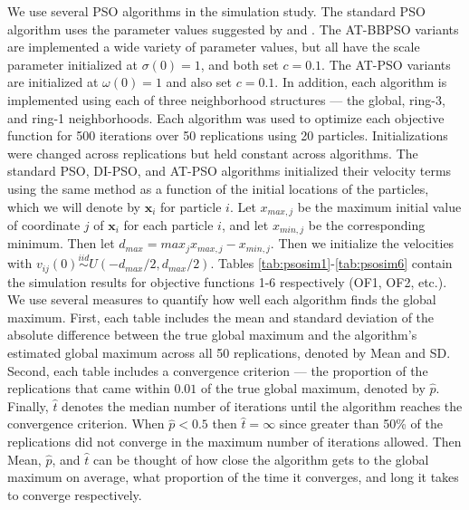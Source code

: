 \documentclass[12pt]{article}
\begin{document}
We use several PSO algorithms in the simulation study. The standard PSO algorithm uses the parameter values suggested by \cite{blum2008swarm} and \cite{clerc2002particle}. The AT-BBPSO variants are implemented a wide variety of parameter values, but all have the scale parameter initialized at $\sigma(0)=1$, and both set $c=0.1$. The AT-PSO variants are initialized at $\omega(0)=1$ and also set $c=0.1$. In addition, each algorithm is implemented using each of three neighborhood structures --- the global, ring-3, and ring-1 neighborhoods. Each algorithm was used to optimize each objective function for 500 iterations over 50 replications using 20 particles. Initializations were changed across replications but held constant across algorithms. The standard PSO, DI-PSO, and AT-PSO algorithms initialized their velocity terms using the same method as a function of the initial locations of the particles, which we will denote by $\bm{x}_i$ for particle $i$. Let $x_{max,j}$ be the maximum initial value of coordinate $j$ of $\bm{x}_i$ for each particle $i$, and let $x_{min,j}$ be the corresponding minimum. Then let $d_{max} = max_{j}x_{max,j} - x_{min,j}$. Then we initialize the velocities with $v_{ij}(0)\stackrel{iid}{\sim}U(-d_{max}/2,d_{max}/2)$. Tables \ref{tab:psosim1}-\ref{tab:psosim6} contain the simulation results for objective functions 1-6 respectively (OF1, OF2, etc.). We use several measures to quantify how well each algorithm finds the global maximum. First, each table includes the mean and standard deviation of the absolute difference between the true global maximum and the algorithm's estimated global maximum across all 50 replications, denoted by Mean and SD. Second, each table includes a convergence criterion --- the proportion of the replications that came within $0.01$ of the true global maximum, denoted by $\widehat{p}$. Finally, $\widehat{t}$ denotes the median number of iterations until the algorithm reaches the convergence criterion. When $\hat{p}<0.5$ then $\hat{t} = \infty$ since greater than 50\% of the replications did not converge in the maximum number of iterations allowed. Then Mean, $\hat{p}$, and $\hat{t}$ can be thought of how close the algorithm gets to the global maximum on average, what proportion of the time it converges, and long it takes to converge respectively.
\end{document}
